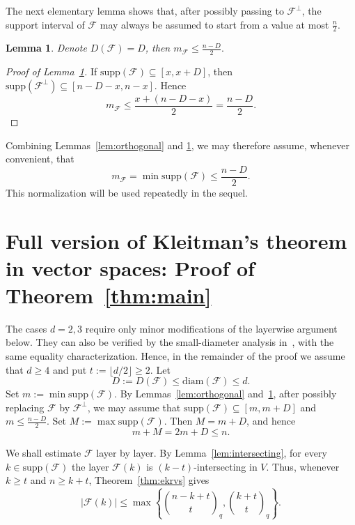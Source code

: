 \documentclass[11pt]{article}
\newtheorem{lemma}[theorem]{Lemma}
\theoremstyle{definition}
\newcommand{\qbinom}[2]{\genfrac{(}{)}{0pt}{}{#1}{#2}_q}
\newcommand{\diam}{\mathrm{diam}}
\newcommand{\supp}{\mathrm{supp}}
\begin{document}
The next elementary lemma shows that, after possibly passing to $\mathcal{F}^\perp$, the support interval of $\mathcal{F}$ may always be assumed to start from a value at most $\frac{n}{2}$.

\begin{lemma}\label{lem:min-bound}
Denote $D(\mathcal{F})=D$, then
\(
m_{\mathcal{F}}\le \frac{n-D}{2}.
\)
\end{lemma}

\begin{proof}[Proof of Lemma~\ref{lem:min-bound}]
If $\supp(\mathcal{F}) \subseteq [x,x+D]$, then
\(
\supp(\mathcal{F}^\perp) \subseteq [n-D-x,n-x].
\)
Hence
\[
m_{\mathcal{F}}
\le
\frac{x+(n-D-x)}{2}
=
\frac{n-D}{2}.
\]
\qedhere
\end{proof}

Combining Lemmas~\ref{lem:orthogonal} and \ref{lem:min-bound}, we may therefore assume, whenever convenient, that
\begin{equation*}
m_{\mathcal{F}}
=
\min\supp(\mathcal{F})
\le
\frac{n-D}{2}.
\end{equation*}
This normalization will be used repeatedly in the sequel.

\section{Full version of Kleitman's theorem in vector spaces: Proof of Theorem~\ref{thm:main}}\label{sec:main-proof}
The cases \(d=2,3\) require only minor modifications of the layerwise argument below. They can also be verified by the small-diameter analysis in~\cite{LLY2026}, with the same equality characterization. Hence, in the remainder of the proof we assume that \(d\ge4\) and put
\(
t:=\lfloor d/2\rfloor\ge 2.
\)
 Let
\[
D:=D(\mathcal F)\le \diam(\mathcal F)\le d.
\]
Set $m:=\min \supp(\mathcal{F})$.
By Lemmas~\ref{lem:orthogonal} and~\ref{lem:min-bound}, after possibly replacing $\mathcal F$ by $\mathcal F^\perp$, we may assume that 
\(
\supp(\mathcal F) \subseteq [m,m+D]\) and
\(
m\le \frac{n-D}{2}.
\)
Set
\(
M:=\max\supp(\mathcal F).
\)
Then $M= m+D$, and hence
\begin{equation}\label{eq:mM}
m+M= 2m+D\le n.
\end{equation}

We shall estimate $\mathcal F$ layer by layer. 
By Lemma~\ref{lem:intersecting}, for every $k\in\supp(\mathcal F)$ the layer $\mathcal F(k)$ is $(k-t)$-intersecting in $V$. 
Thus, whenever $k\ge t$ and $n\ge k+t$, Theorem~\ref{thm:ekrvs} gives
\begin{equation}\label{eq:slice-bound}
|\mathcal F(k)|
\le
\max\left\{
\qbinom{n-k+t}{t},
\qbinom{k+t}{t}
\right\}.
\end{equation}
\end{document}
